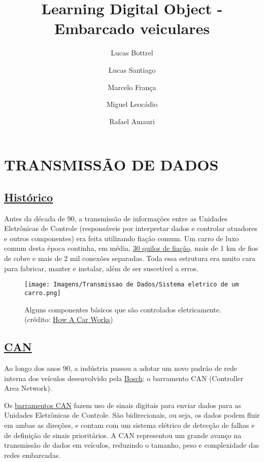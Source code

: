 \documentclass{article}
\title{Learning Digital Object - Embarcado veiculares}
\author{Lucas Bottrel \and Lucas Santiago \and Marcelo França \and Miguel Leocádio \and Rafael Amauri}
\begin{document}
\maketitle

\newpage

\section*{TRANSMISSÃO DE DADOS}
\subsection*{\underline{Histórico}}

\hspace{4pt} Antes da década de 90, a transmissão de informações entre as Unidades Eletrônicas de Controle (responsáveis por 
interpretar dados e controlar atuadores e outros componentes) era feita utilizando fiação comum. Um carro de luxo 
comum desta época continha, em média, \href{https://www.youtube.com/watch?v=ptH8zxhf-jM}{30 quilos de fiação}, mais de 1 km de fios de cobre e mais de 2 mil conexões separadas. 
Toda essa estrutura era muito cara para fabricar, manter e instalar, além de ser suscetível a erros.



\begin{figure}[ht]
    \centering
    \texttt{[image: Imagens/Transmissao de Dados/Sistema eletrico de um carro.png]}
    \caption{Alguns componentes básicos que são controlados eletricamente. (crédito: \href{https://www.howacarworks.com/basics/how-car-electrical-systems-work}{How A Car Works})}
\end{figure}


\subsection*{\underline{CAN}}

\hspace{4pt} Ao longo dos anos 90, a indústria passou a adotar um novo padrão de rede interna dos veículos desenvolvido pela \href{http://esd.cs.ucr.edu/webres/can20.pdf}{Bosch}: o barramento CAN (Controller Area Network).

Os \href{https://www.youtube.com/watch?v=5eh8Poz5g7M}{barramentos CAN} fazem uso de sinais digitais para enviar dados para as Unidades Eletrônicas de Controle. São bidirecionais, ou seja, os dados podem fluir em ambas as direções, e contam com um sistema elétrico de detecção de falhas e de definição de sinais prioritários. A CAN representou um grande avanço na transmissão de dados em veículos, reduzindo o tamanho, peso e complexidade das redes embarcadas.
\end{document}

